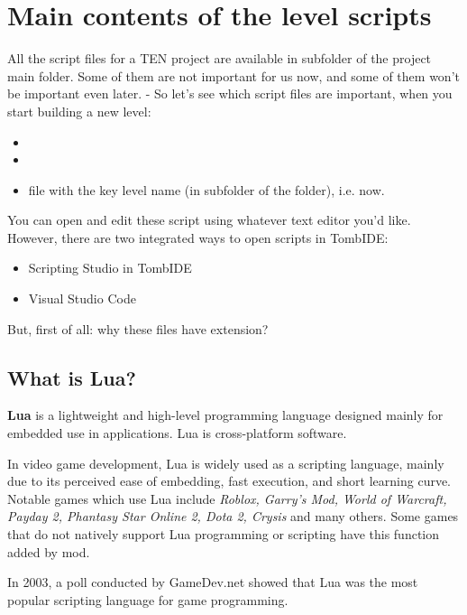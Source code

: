 \chapter{Main contents of the level scripts}
All the script files for a TEN project are available in  subfolder of the project main folder.
Some of them are not important for us now, and some of them won't be important even later. - So let's see which script files are important, when you start building a new level:
\begin{itemize}
    \item {}
    \item {}
    \item {} file with the key level name (in  subfolder of the  folder), i.e.  now.
\end{itemize}

You can open and edit these script using whatever text editor you'd like. However, there are two integrated ways to open scripts in TombIDE:
\begin{itemize}
    \item Scripting Studio in TombIDE
    \item Visual Studio Code
\end{itemize}

But, first of all: why these files have  extension?

\section{What is Lua?}

\textbf{Lua} is a lightweight and high-level programming language designed mainly for embedded use in applications. Lua is cross-platform software.

\par In video game development, Lua is widely used as a scripting language, mainly due to its perceived ease of embedding, fast execution, and short learning curve. Notable games which use Lua include \emph{Roblox, Garry's Mod, World of Warcraft, Payday 2, Phantasy Star Online 2, Dota 2, Crysis} and many others. Some games that do not natively support Lua programming or scripting have this function added by mod.

\par In 2003, a poll conducted by GameDev.net showed that Lua was the most popular scripting language for game programming. \cite{LUA_Wikipedia}

